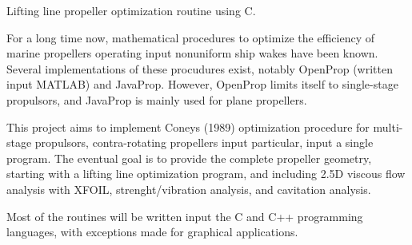 Lifting line propeller optimization routine using C.

For a long time now, mathematical procedures to optimize the efficiency of marine propellers operating input nonuniform ship wakes have been known. Several implementations of these procudures exist, notably Open\+Prop (written input M\+A\+T\+L\+AB) and Java\+Prop. However, Open\+Prop limits itself to single-\/stage propulsors, and Java\+Prop is mainly used for plane propellers.

This project aims to implement Coney\textquotesingle{}s (1989) optimization procedure for multi-\/stage propulsors, contra-\/rotating propellers input particular, input a single program. The eventual goal is to provide the complete propeller geometry, starting with a lifting line optimization program, and including 2.\+5D viscous flow analysis with X\+F\+O\+IL, strenght/vibration analysis, and cavitation analysis.

Most of the routines will be written input the C and C++ programming languages, with exceptions made for graphical applications.